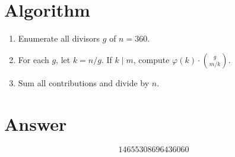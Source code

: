 \documentclass[12pt]{article}
\begin{document}
\section{Algorithm}
\begin{enumerate}
    \item Enumerate all divisors $g$ of $n = 360$.
    \item For each $g$, let $k = n/g$. If $k \mid m$, compute $\varphi(k) \cdot \binom{g}{m/k}$.
    \item Sum all contributions and divide by $n$.
\end{enumerate}

\section{Answer}

\[
\boxed{14655308696436060}
\]
\end{document}
